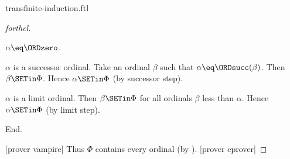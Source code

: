 \documentclass{stex}
\begin{document}
\begin{smodule}{transfinite-induction.ftl}
\begin{proof}[forthel]
    \begin{case}{$\alpha \eq \ORDzero$.} \end{case}

    \begin{case}{$\alpha$ is a successor ordinal.}
      Take an ordinal $\beta$ such that $\alpha \eq \ORDsucc(\beta)$.
      Then $\beta \SETin \Phi$.
      Hence $\alpha \SETin \Phi$ (by successor step).
    \end{case}

    \begin{case}{$\alpha$ is a limit ordinal.}
      Then $\beta \SETin \Phi$ for all ordinals $\beta$ less than $\alpha$.
      Hence $\alpha \SETin \Phi$ (by limit step).
    \end{case}
  End.

  [prover vampire]
  Thus $\Phi$ contains every ordinal (by ).
  [prover eprover]
\end{proof}
\end{smodule}
\end{document}
